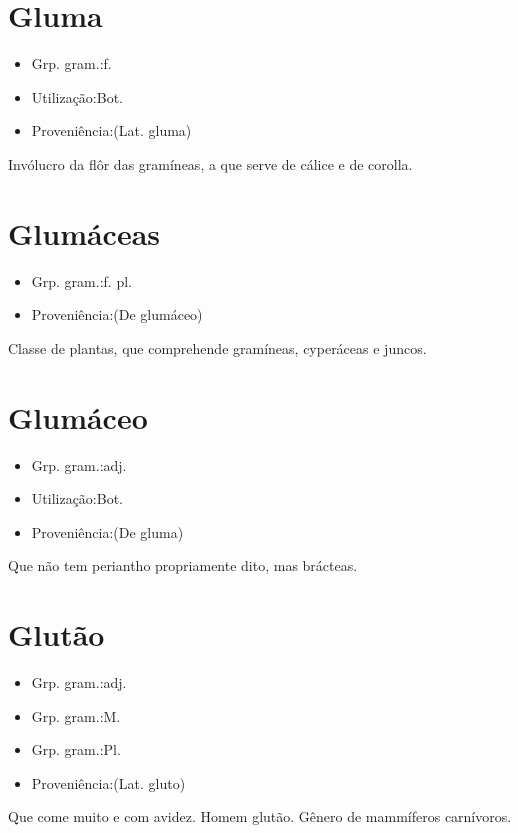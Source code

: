 \section{Gluma}
\begin{itemize}
\item {Grp. gram.:f.}
\end{itemize}
\begin{itemize}
\item {Utilização:Bot.}
\end{itemize}
\begin{itemize}
\item {Proveniência:(Lat. \textunderscore gluma\textunderscore )}
\end{itemize}
Invólucro da flôr das gramíneas, a que serve de cálice e de corolla.
\section{Glumáceas}
\begin{itemize}
\item {Grp. gram.:f. pl.}
\end{itemize}
\begin{itemize}
\item {Proveniência:(De \textunderscore glumáceo\textunderscore )}
\end{itemize}
Classe de plantas, que comprehende gramíneas, cyperáceas e juncos.
\section{Glumáceo}
\begin{itemize}
\item {Grp. gram.:adj.}
\end{itemize}
\begin{itemize}
\item {Utilização:Bot.}
\end{itemize}
\begin{itemize}
\item {Proveniência:(De \textunderscore gluma\textunderscore )}
\end{itemize}
Que não tem periantho propriamente dito, mas brácteas.
\section{Glutão}
\begin{itemize}
\item {Grp. gram.:adj.}
\end{itemize}
\begin{itemize}
\item {Grp. gram.:M.}
\end{itemize}
\begin{itemize}
\item {Grp. gram.:Pl.}
\end{itemize}
\begin{itemize}
\item {Proveniência:(Lat. \textunderscore gluto\textunderscore )}
\end{itemize}
Que come muito e com avidez.
Homem glutão.
Gênero de mammíferos carnívoros.
